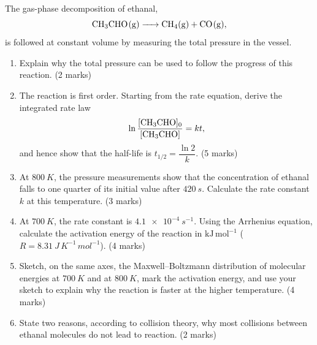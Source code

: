 \documentclass[11pt]{article}
\begin{document}
\begin{exercice}
The gas-phase decomposition of ethanal,
\[
\ce{CH3CHO(g) -> CH4(g) + CO(g)},
\]
is followed at constant volume by measuring the total pressure in the vessel.
\begin{enumerate}
\item Explain why the total pressure can be used to follow the progress of this reaction. \hfill (2 marks)
\item The reaction is first order. Starting from the rate equation, derive the integrated rate law
\[
\ln\frac{[\ce{CH3CHO}]_0}{[\ce{CH3CHO}]} = kt,
\]
and hence show that the half-life is $t_{1/2} = \dfrac{\ln 2}{k}$. \hfill (5 marks)
\item At $\SI{800}{K}$, the pressure measurements show that the concentration of ethanal falls to one quarter of its initial value after $\SI{420}{s}$. Calculate the rate constant $k$ at this temperature. \hfill (3 marks)
\item At $\SI{700}{K}$, the rate constant is $\SI{4.1e-4}{s^{-1}}$. Using the Arrhenius equation, calculate the activation energy of the reaction in $\mathrm{kJ\,mol^{-1}}$ ($R = \SI{8.31}{J\,K^{-1}\,mol^{-1}}$). \hfill (4 marks)
\item Sketch, on the same axes, the Maxwell--Boltzmann distribution of molecular energies at $\SI{700}{K}$ and at $\SI{800}{K}$, mark the activation energy, and use your sketch to explain why the reaction is faster at the higher temperature. \hfill (4 marks)
\item State two reasons, according to collision theory, why most collisions between ethanal molecules do not lead to reaction. \hfill (2 marks)
\end{enumerate}
\end{exercice}
\end{document}
